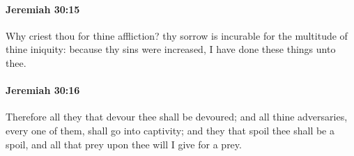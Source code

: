 		\paragraph{Jeremiah 30:15} %
			\label{JEREMIAH-30-15}

			Why criest thou for thine affliction? thy sorrow is incurable for the multitude of thine iniquity: because thy sins were increased, I have done these things unto thee.


		\paragraph{Jeremiah 30:16} %
			\label{JEREMIAH-30-16}

			Therefore all they that devour thee shall be devoured; and all thine adversaries, every one of them, shall go into captivity; and they that spoil thee shall be a spoil, and all that prey upon thee will I give for a prey.

